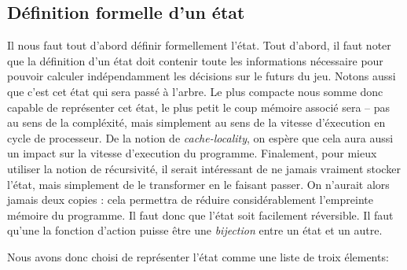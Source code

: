 \documentclass[a4paper,11pt]{article}
\begin{document}
\begin{multicols}{2}[]
  \subsection{Définition formelle d'un état}

    Il nous faut tout d'abord définir formellement l'état. Tout d'abord, il
    faut noter que la définition d'un état doit contenir toute les informations
    nécessaire pour pouvoir calculer indépendamment les décisions sur le futurs
    du jeu. Notons aussi que c'est cet état qui sera passé à l'arbre. Le plus
    compacte nous somme donc capable de représenter cet état, le plus petit le
    coup mémoire associé sera -- pas au sens de la compléxité, mais simplement
    au sens de la vitesse d'éxecution en cycle de processeur. De la notion de
    \emph{cache-locality}, on espère que cela aura aussi un impact sur la
    vitesse d'execution du programme. Finalement, pour mieux utiliser la notion
    de récursivité, il serait intéressant de ne jamais vraiment stocker l'état,
    mais simplement de le transformer en le faisant passer. On n'aurait alors
    jamais deux copies : cela permettra de réduire considérablement l'empreinte
    mémoire du programme. Il faut donc que l'état soit facilement réversible.
    Il faut qu'une la fonction d'action puisse être une \emph{bijection} entre
    un état et un autre.

    Nous avons donc choisi de représenter l'état comme une liste de troix
    élements:


\end{multicols}
\end{document}

